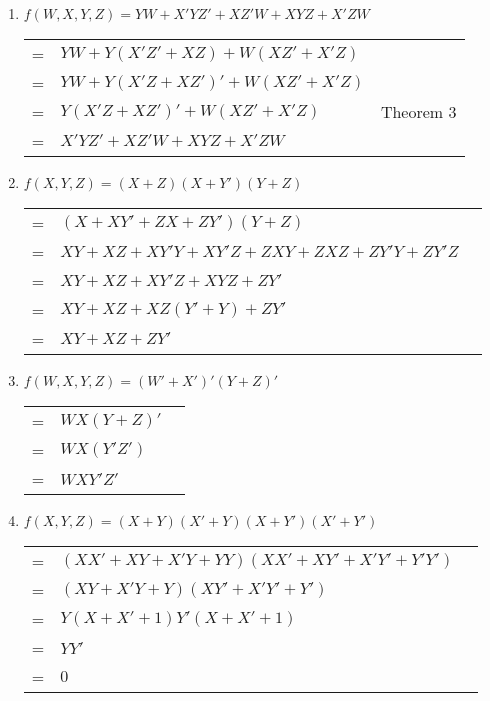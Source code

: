 \documentclass[12pt]{article}
\begin{document}
\begin{enumerate}
    \pagebreak
    
    \item $f(W, X, Y, Z) = YW + X'YZ' + XZ'W + XYZ + X'ZW$ \\
    \begin{tabular}{r l l}
        = & $YW + Y(X'Z' + XZ) + W(XZ' + X'Z)$ & \\
        = & $YW + Y(X'Z + XZ')' + W(XZ' + X'Z)$ & \\
        = & $Y(X'Z + XZ')' + W(XZ' + X'Z)$ & Theorem 3 \\
        = & $X'YZ' + XZ'W + XYZ + X'ZW$ & \\
    \end{tabular}
    
    \pagebreak
    
    \item $f(X, Y, Z) = (X + Z)(X + Y')(Y + Z)$ \\
    \begin{tabular}{r l l}
        = & $(X + XY' + ZX + ZY')(Y + Z)$ & \\
        = & $XY + XZ + XY'Y + XY'Z + ZXY + ZXZ + ZY'Y + ZY'Z$ & \\
        = & $XY + XZ + XY'Z + XYZ + ZY'$ & \\
        = & $XY + XZ + XZ(Y' + Y) + ZY'$ & \\
        = & $XY + XZ + ZY'$ & \\
    \end{tabular}
    
    \vspace{20mm}
    
    \item $f(W, X, Y, Z) = (W' + X')' (Y + Z)'$\\
    \begin{tabular}{r l l}
        = & $WX(Y+Z)'$ & \\
        = & $WX(Y'Z')$ & \\
        = & $WXY'Z'$ & \\
    \end{tabular}
    
    \pagebreak
    
    \item $f(X, Y, Z) = (X + Y)(X' + Y)(X + Y')(X' + Y')$ \\
    \begin{tabular}{r l l}
        = & $(XX' + XY + X'Y + YY)(XX' + XY' + X'Y' + Y'Y')$ & \\
        = & $(XY + X'Y + Y)(XY' + X'Y' + Y')$ & \\
        = & $Y(X + X' + 1)Y'(X + X' + 1)$ & \\
        = & $YY'$ & \\
        = & $0$ & \\
    \end{tabular}
    

\end{enumerate}
\end{document}
